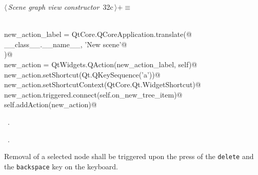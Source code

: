 \documentclass[
    a4paper,      %
    10pt,         %
    openright,    %
    notitlepage,  %
    parskip=half, %
]{scrreprt}       %
\theoremstyle{definition}                    %
\begin{document}
\begin{flushleft} \small
\begin{minipage}{\linewidth}\label{scrap38}\raggedright\small
{} $\langle\,${\itshape Scene graph view constructor}\nobreak\ {\footnotesize {32c}}$\,\rangle+\equiv$
\vspace{-1ex}
\begin{list}{}{} \item
\mbox{}\lstinline@@\\
\mbox{}\lstinline@    new_action_label = QtCore.QCoreApplication.translate(@\\
\mbox{}\lstinline@        __class__.__name__, 'New scene'@\\
\mbox{}\lstinline@    )@\\
\mbox{}\lstinline@    new_action = QtWidgets.QAction(new_action_label, self)@\\
\mbox{}\lstinline@    new_action.setShortcut(Qt.QKeySequence('a'))@\\
\mbox{}\lstinline@    new_action.setShortcutContext(QtCore.Qt.WidgetShortcut)@\\
\mbox{}\lstinline@    new_action.triggered.connect(self.on_new_tree_item)@\\
\mbox{}\lstinline@    self.addAction(new_action)@\\
\mbox{}\lstinline@@{\NWsep}
\end{list}
\vspace{-1.5ex}
\footnotesize
\begin{list}{}{\setlength{\itemsep}{-\parsep}\setlength{\itemindent}{-\leftmargin}}
\item \NWtxtMacroDefBy\ .
\item \NWtxtMacroRefIn\ .

\item{}
\end{list}
\end{minipage}\vspace{4ex}
\end{flushleft}
Removal of a selected node shall be triggered upon the press of the
\verb+delete+ and the \verb+backspace+ key on the keyboard.
\end{document}
